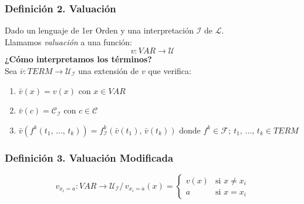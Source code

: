 \documentclass{article}
\newcommand{\comma}{,\,}                                %
\newcommand{\tq}{/\,}                                   %
\newcommand{\familia}{\mathcal{F}}                      %
\newcommand{\ctes}{\mathcal{C}}
\newcommand{\lenguaje}{\mathcal{L}}
\newcommand{\interpretacion}{\mathcal{I}}
\newcommand{\universo}{\mathcal{U}}
\begin{document}
\subsubsection*{Definición 2. Valuación}
Dado un lenguaje de 1er Orden y una interpretación $\interpretacion$ de $\lenguaje$.
\\Llamamos \emph{valuación} a una función: 
\begin{equation*}
    v:VAR \rightarrow \universo
\end{equation*}
\textbf{¿Cómo interpretamos los términos?}
\\Sea $\bar{v}:TERM \rightarrow \universo_\interpretacion$ una extensión de $v$ que verifica:
\begin{enumerate}
    \item $\bar{v}(x) = v(x)$ con $x \in VAR$
    \item $\bar{v}(c) = \ctes_\interpretacion$ con $c \in \ctes$
    \item $\bar{v}(f^k(t_1 \comma ... \comma t_k)) = f^k_\interpretacion(\bar{v}(t_1) \comma \bar{v}(t_k))$ donde $f^k \in \familia;\:t_1 \comma ... \comma t_k \in TERM$
\end{enumerate}

\subsubsection*{Definición 3. Valuación Modificada}
\begin{equation*}
    v_{x_i=a}:VAR \rightarrow \universo_\interpretacion \tq 
    v_{x_i=a}(x) = 
    \begin{cases}
    v(x) &\text{si } x \neq x_i \\
    a    &\text{si } x = x_i
    \end{cases}
\end{equation*}
\end{document}
